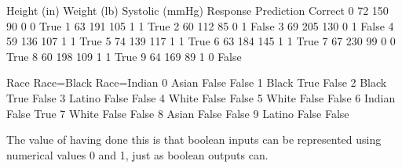 \documentclass[letterpaper,10pt,english]{sphinxmanual}
\begin{document}
\begin{sphinxVerbatim}[commandchars=\\\{\}]
   Height (in)  Weight (lb)  Systolic (mmHg)  Response  Prediction  Correct  \PYGZbs{}
0           72          150               90         0           0     True   
1           63          191              105         1           1     True   
2           60          112               85         0           1    False   
3           69          205              130         0           1    False   
4           59          136              107         1           1     True   
5           74          139              117         1           1     True   
6           63          184              145         1           1     True   
7           67          230               99         0           0     True   
8           60          198              109         1           1     True   
9           64          169               89         1           0    False   

     Race  Race=Black  Race=Indian  
0   Asian       False        False  
1   Black        True        False  
2   Black        True        False  
3  Latino       False        False  
4   White       False        False  
5   White       False        False  
6  Indian       False         True  
7   White       False        False  
8   Asian       False        False  
9  Latino       False        False  
\end{sphinxVerbatim}

The value of having done this is that boolean inputs can be represented using numerical values 0 and 1, just as boolean outputs can.

\begin{sphinxVerbatim}[commandchars=\\\{\}]
\PYG{p}{[}\PYG{p}{]}  \PYG{p}{[}\PYG{p}{]}  
\PYG{p}{[}\PYG{p}{]}  \PYG{p}{[}\PYG{p}{]}  
\end{sphinxVerbatim}
\end{document}
